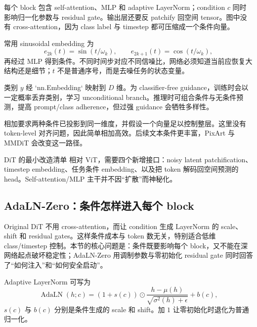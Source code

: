 每个 block 包含 self-attention、MLP 和 adaptive LayerNorm；condition $c$ 同时影响归一化参数与 residual gate。输出层还要反 patchify 回空间 tensor。图中没有 cross-attention，因为 class label 与 timestep 都可压缩成一个条件向量。


常用 sinusoidal embedding 为
\[
e_{2k}(t)=\sin(t/\omega_k),\qquad
e_{2k+1}(t)=\cos(t/\omega_k),
\]
再经过 MLP 得到条件。不同时间步对应不同信噪比，网络必须知道当前应恢复大结构还是细节；$t$ 不是普通序号，而是去噪任务的状态变量。


类别 $y$ 经 `nn.Embedding` 映射到 $D$ 维。为 classifier-free guidance，训练时会以一定概率丢弃类别，学习 unconditional branch。推理时可组合条件与无条件预测，提高 prompt/class adherence，但过强 guidance 会牺牲多样性。


相加要求两种条件已投影到同一维度，并假设一个向量足以控制整层。这里没有 token-level 对齐问题，因此简单相加高效。后续文本条件更丰富，PixArt 与 MMDiT 会改变这一路径。

\begin{importantbox}{DiT 的最小改造清单}
相对 ViT，需要四个新增接口：noisy latent patchification、timestep embedding、任务条件 embedding、以及把 token 解码回空间预测的 head。Self-attention/MLP 主干并不因“扩散”而神秘化。
\end{importantbox}

\subsection{AdaLN-Zero：条件怎样进入每个 block}

Original DiT 不用 cross-attention，而让 condition 生成 LayerNorm 的 scale、shift 和 residual gates。这样条件成本与 token 数无关，特别适合低维 class/timestep 控制。本节的核心问题是：条件既要影响每个 block，又不能在深网络起点破坏稳定性；AdaLN-Zero 用调制参数与零初始化 residual gate 同时回答了“如何注入”和“如何安全启动”。


Adaptive LayerNorm 可写为
\[
\operatorname{AdaLN}(h;c)=
(1+s(c))\odot\frac{h-\mu(h)}{\sqrt{\sigma^2(h)+\epsilon}}+b(c),
\]
$s(c)$ 与 $b(c)$ 分别是条件生成的 scale 和 shift。加 $1$ 让零初始化时退化为普通归一化。

